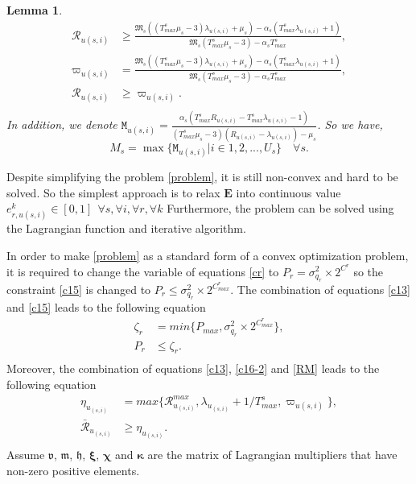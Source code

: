 \documentclass[conference]{IEEEtran}
\newtheorem{lemma}{Lemma}
\begin{document}
\begin{lemma}
\begin{equation}\label{RM}
\begin{split}
\mathcal{R}_{u(s,i)} &\geq \frac{\mathfrak{M}_s ((T_{max}^s\mu_s-3)\lambda_{u(s,i)} + \mu_s) - \alpha_s(T_{max}^s\lambda_{u(s,i)} +1) }{\mathfrak{M}_s (T_{max}^s\mu_s-3)-\alpha_s T_{max}^s},\\
\varpi_{u(s,i)} &= \frac{\mathfrak{M}_s ((T_{max}^s\mu_s-3)\lambda_{u(s,i)} + \mu_s) - \alpha_s(T_{max}^s\lambda_{u(s,i)} +1) }{\mathfrak{M}_s (T_{max}^s\mu_s-3)-\alpha_s T_{max}^s},\\
\mathcal{R}_{u(s,i)} &\geq \varpi_{u(s,i)}. \\
\end{split}
\end{equation}
In addition, we denote $\mathtt{M}_{u(s,i)} = \frac{\alpha_s(T_{max}^s R_{u(s,i)}-T_{max}^s\lambda_{u(s,i)} -1)}{(T_{max}^s\mu_s-3)(R_{u(s,i)}-\lambda_{u(s,i)}) - \mu_s }$.
So we have,
\begin{equation}
M_s = \max\{\mathtt{M}_{u(s,i)} | i \in 1,2,..., U_s\} \quad \forall s .
\end{equation}
\end{lemma}
Despite simplifying the problem \eqref{problem}, it is still non-convex and hard to be solved.
So the simplest approach is to relax $\mathbf{E}$ into continuous value $e_{r,u(s,i)}^k \in [0,1] \:\: \forall s , \forall i ,\forall r, \forall k$
Furthermore, the problem can  be solved using the Lagrangian function and iterative algorithm.

In order to make \eqref{problem} as a standard form of a convex optimization problem, it is required to change the variable of equations \eqref{cr} to $P_r = \sigma_{q_r}^2\times 2^{C^r}$ so the constraint 
\eqref{c15} is changed to
 $P_r \leq \sigma_{q_r}^2\times 2^{C^r_{max}}$.
The combination of equations \eqref{c13} and \eqref{c15} leads to the following equation
\begin{equation}
\begin{split}
\zeta_{r}&= min\{P_{max}, \sigma_{q_r}^2\times 2^{C^r_{max}} \}, \\
P_r &\leq  \zeta_{r}.\\
\end{split}
\end{equation} 
Moreover, the combination of equations \eqref{c13}, \eqref{c16-2} and \eqref{RM} leads to the following equation
\begin{equation}\label{RConstr}
\begin{split}
\eta_{u_{(s,i)}}&= max\{\mathcal{R}_{u_{(s,i)}}^{max}, \lambda_{u_{(s,i)}}+1/T^s_{max}, \varpi_{u(s,i)} \}, \\
\mathcal{\bar{R}}_{u_{(s,i)}} &\geq  \eta_{u_{(s,i)}}.\\
\end{split}
\end{equation}
Assume $\boldsymbol{\mathfrak{v}}$, $\boldsymbol{\mathfrak{m}}$, $\boldsymbol{\mathfrak{h}}$, $\boldsymbol{\xi}$, $\boldsymbol{\chi}$ and $\boldsymbol{ \kappa}$ are the matrix of Lagrangian multipliers that have non-zero positive elements.
\end{document}

